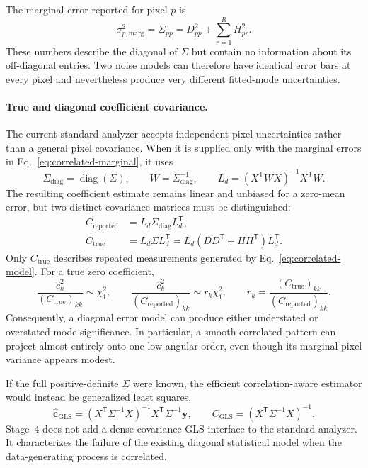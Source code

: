 \documentclass[aps,prb,preprint,onecolumn,notitlepage,amsmath,amssymb,
  superscriptaddress,floatfix]{revtex4-2}
\newcommand{\trans}{\mathsf{T}}
\begin{document}
The marginal error reported for pixel $p$ is
\begin{equation}
 \sigma_{p,\mathrm{marg}}^2=\Sigma_{pp}
 =D_{pp}^2+\sum_{r=1}^{R}H_{pr}^2.
 \label{eq:correlated-marginal}
\end{equation}
These numbers describe the diagonal of $\Sigma$ but contain no information
about its off-diagonal entries.  Two noise models can therefore have identical
error bars at every pixel and nevertheless produce very different fitted-mode
uncertainties.

\paragraph{True and diagonal coefficient covariance.}
The current standard analyzer accepts independent pixel uncertainties rather
than a general pixel covariance.  When it is supplied only with the marginal
errors in Eq.~\eqref{eq:correlated-marginal}, it uses
\begin{equation}
 \Sigma_{\mathrm{diag}}=\operatorname{diag}(\Sigma),
 \qquad W=\Sigma_{\mathrm{diag}}^{-1},
 \qquad
 L_d=(X^{\trans}WX)^{-1}X^{\trans}W.
 \label{eq:correlated-diagonal-response}
\end{equation}
The resulting coefficient estimate remains linear and unbiased for a
zero-mean error, but two distinct covariance matrices must be distinguished:
\begin{align}
 C_{\mathrm{reported}}
 &=L_d\Sigma_{\mathrm{diag}}L_d^{\trans},
 \label{eq:correlated-reported-covariance}\\
 C_{\mathrm{true}}
 &=L_d\Sigma L_d^{\trans}
 =L_d(DD^{\trans}+HH^{\trans})L_d^{\trans}.
 \label{eq:correlated-true-covariance}
\end{align}
Only $C_{\mathrm{true}}$ describes repeated measurements generated by
Eq.~\eqref{eq:correlated-model}.  For a true zero coefficient,
\begin{equation}
 \frac{\widehat c_k^2}{(C_{\mathrm{true}})_{kk}}\sim\chi_1^2,
 \qquad
 \frac{\widehat c_k^2}{(C_{\mathrm{reported}})_{kk}}
 \sim r_k\chi_1^2,
 \qquad
 r_k=\frac{(C_{\mathrm{true}})_{kk}}
 {(C_{\mathrm{reported}})_{kk}}.
 \label{eq:correlated-power-scaling}
\end{equation}
Consequently, a diagonal error model can produce either understated or
overstated mode significance.  In particular, a smooth correlated pattern
can project almost entirely onto one low angular order, even though its
marginal pixel variance appears modest.

If the full positive-definite $\Sigma$ were known, the efficient
correlation-aware estimator would instead be generalized least squares,
\begin{equation}
 \widehat{\bm c}_{\mathrm{GLS}}
 =(X^{\trans}\Sigma^{-1}X)^{-1}X^{\trans}\Sigma^{-1}\bm y,
 \qquad
 C_{\mathrm{GLS}}=(X^{\trans}\Sigma^{-1}X)^{-1}.
 \label{eq:correlated-gls}
\end{equation}
Stage~4 does not add a dense-covariance GLS interface to the standard
analyzer.  It characterizes the failure of the existing diagonal statistical
model when the data-generating process is correlated.
\end{document}
